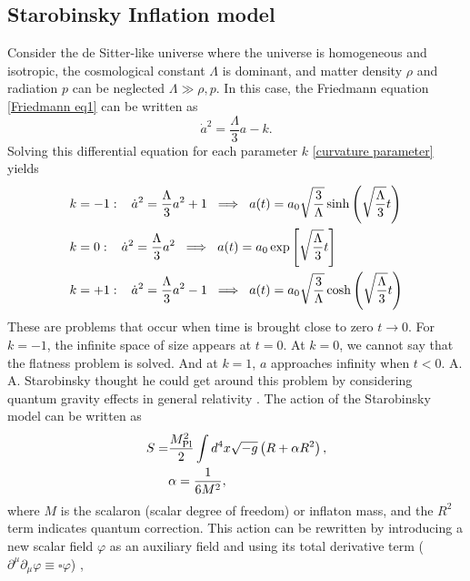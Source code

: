 \documentclass[12pt]{article}
\numberwithin{equation}{section}
\begin{document}
\subsection{Starobinsky Inflation model}
Consider the de Sitter-like universe where the universe is homogeneous and isotropic, the cosmological constant $\Lambda$ is dominant, and matter density $\rho$ and radiation $p$ can be neglected $\Lambda \gg  \rho, p$. In this case, the Friedmann equation \eqref{Friedmann eq1} can be written as
\begin{equation}
    \dot{a}^2 = \frac{\Lambda}{3}a - k.
\end{equation}
Solving this differential equation for each parameter $k$ \eqref{curvature parameter} yields
\begin{align}
    k &= -1:\hspace{0.3cm} \dot{a}^2 = \frac{\Lambda}{3}a^2 + 1 \hspace{0.2cm} \Longrightarrow \hspace{0.2cm} a(t) = a_0 \sqrt{\frac{3}{\Lambda}}\sinh \left( \sqrt{\frac{\Lambda}{3}}t \right)\\
    k &= 0:\hspace{0.3cm} \dot{a}^2 = \frac{\Lambda}{3}a^2 \hspace{0.2cm} \Longrightarrow \hspace{0.2cm} a(t) = a_0 \exp\left[ \sqrt{\frac{\Lambda}{3}}t \right]\\
    k &= +1:\hspace{0.3cm} \dot{a}^2 = \frac{\Lambda}{3}a^2 - 1 \hspace{0.2cm} \Longrightarrow \hspace{0.2cm} a(t) = a_0 \sqrt{\frac{3}{\Lambda}}\cosh \left( \sqrt{\frac{\Lambda}{3}}t \right)
\end{align}
These are problems that occur when time is brought close to zero $t \to 0$. For $k=-1$, the infinite space of size appears at $t = 0$. At $k=0$, we cannot say that the flatness problem is solved. And at $k=1$, $a$ approaches infinity when $t < 0$. A. A. Starobinsky thought he could get around this problem by considering quantum gravity effects in general relativity \cite{Starobinsky:1980te}. The action of the Starobinsky model can be written as
\begin{align}
    S =& \frac{M_{\textrm{Pl}}^2}{2}\int d^4 x \sqrt{-g}\left( R + \alpha R^2 \right),\\
    &\alpha = \frac{1}{6M^2},\notag
\end{align}
where $M$ is the scalaron (scalar degree of freedom) or inflaton mass, and the $R^2$ term indicates quantum correction. This action can be rewritten by introducing a new scalar field $\varphi$ as an auxiliary field and using its total derivative term ($\partial^{\mu}\partial_{\mu}\varphi \equiv \square \varphi$) \cite{Whitt:1984pd}, 
\end{document}
